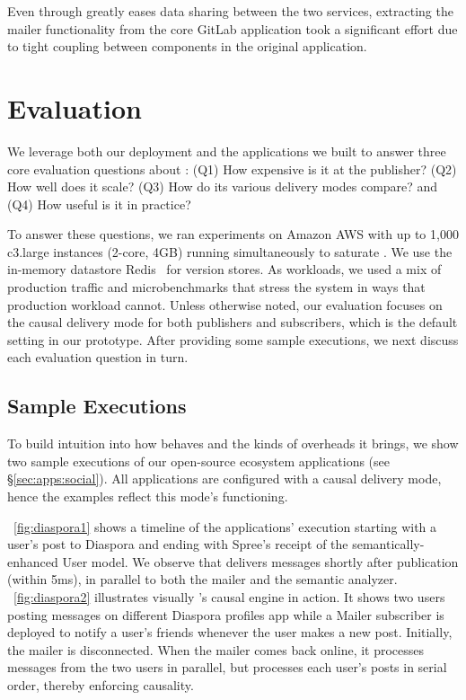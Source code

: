 Even through \synapse greatly eases data sharing between the two services,
extracting the mailer functionality from the core GitLab application took
a significant effort due to tight coupling between components in the original
application.


\section{Evaluation}
\label{sec:evaluation}


We leverage both our deployment and the applications we built to answer three
core evaluation questions about \synapse: (Q1) How expensive is it
at the publisher? (Q2) How well does it scale? (Q3) How do its various
delivery modes compare? and (Q4) How useful is it in practice?

To answer these questions, we ran experiments on Amazon AWS with up to 1,000
c3.large instances (2-core, 4GB) running simultaneously to saturate \synapse.
We use the in-memory datastore Redis~\cite{redis} for version stores.
As workloads, we used a mix of \crowdtap production traffic and microbenchmarks
that stress the system in ways that production workload cannot.  Unless
otherwise noted, our evaluation focuses on the causal delivery mode for both publishers and subscribers, which is
the default setting in our prototype.  After providing some sample executions,
we next discuss each evaluation question in turn.


\subsection{Sample Executions}
\label{sec:evaluation:sample-runs}

To build intuition into how \synapse behaves and the kinds of overheads it
brings, we show two sample executions of our open-source ecosystem
applications (see \S\ref{sec:apps:social}). All applications are configured
with a causal delivery mode, hence the examples reflect this mode's functioning.

\F~\ref{fig:diaspora1} shows a timeline of the applications' execution
starting with a user's post to Diaspora and ending with Spree's receipt of the
semantically-enhanced User model. We observe that \synapse delivers messages
shortly after publication (within 5ms), in parallel to both the mailer and
the semantic analyzer.  \F~\ref{fig:diaspora2}  illustrates visually
\synapse's causal engine in action. It shows two users posting messages on
different Diaspora profiles app while a Mailer subscriber is deployed to notify
a user's friends whenever the user makes a new post.  Initially, the mailer is
disconnected. When the mailer comes back online, it processes messages from the
two users in parallel, but processes each user's posts in serial order, thereby
enforcing causality.


